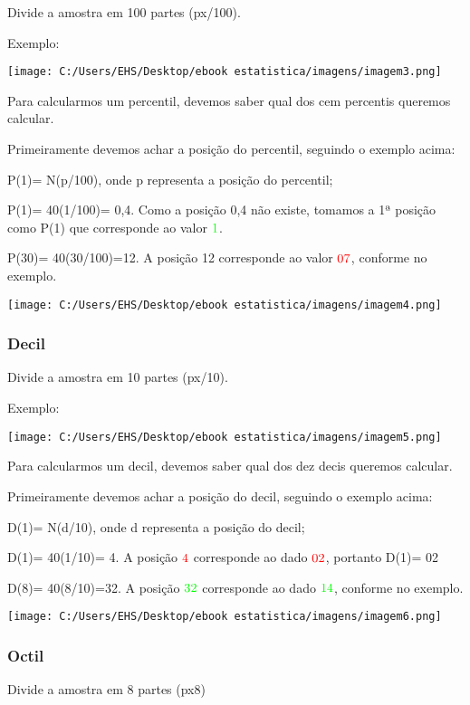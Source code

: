 \documentclass[]{book}
\begin{document}
Divide a amostra em 100 partes (px/100).

Exemplo:

\texttt{[image: C:/Users/EHS/Desktop/ebook estatistica/imagens/imagem3.png]}

Para calcularmos um percentil, devemos saber qual dos cem percentis queremos calcular.

Primeiramente devemos achar a posição do percentil, seguindo o exemplo acima:

P(1)= N(p/100), onde p representa a posição do percentil;

P(1)= 40(1/100)= 0,4. Como a posição 0,4 não existe, tomamos a 1ª posição como P(1) que corresponde ao valor \(\color{green}{\text{1}}\).

P(30)= 40(30/100)=12. A posição 12 corresponde ao valor \(\color{red}{\text{07}}\), conforme no exemplo.

\texttt{[image: C:/Users/EHS/Desktop/ebook estatistica/imagens/imagem4.png]}

\hypertarget{decil}{%
\subsubsection{Decil}\label{decil}}

Divide a amostra em 10 partes (px/10).

Exemplo:

\texttt{[image: C:/Users/EHS/Desktop/ebook estatistica/imagens/imagem5.png]}

Para calcularmos um decil, devemos saber qual dos dez decis queremos calcular.

Primeiramente devemos achar a posição do decil, seguindo o exemplo acima:

D(1)= N(d/10), onde d representa a posição do decil;

D(1)= 40(1/10)= 4. A posição \(\color{red}{\text{4}}\) corresponde ao dado \(\color{red}{\text{02}}\), portanto D(1)= 02

D(8)= 40(8/10)=32. A posição \(\color{green}{\text{32}}\) corresponde ao dado \(\color{green}{\text{14}}\), conforme no exemplo.

\texttt{[image: C:/Users/EHS/Desktop/ebook estatistica/imagens/imagem6.png]}

\hypertarget{octil}{%
\subsubsection{Octil}\label{octil}}

Divide a amostra em 8 partes (px8)
\end{document}
